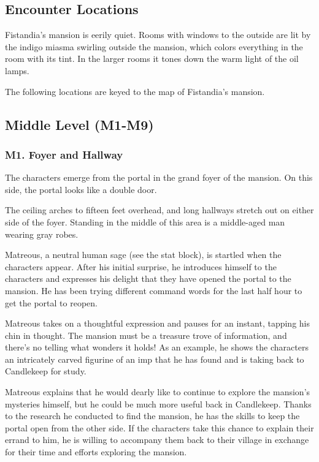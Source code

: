 \documentclass[10pt,a4paper,twoside,bg=print,twocolumn,openany,nodeprecatedcode]{dndbook}
\begin{document}
\subsection{Encounter Locations}
Fistandia's mansion is eerily quiet. Rooms with windows to the outside are lit by the indigo miasma swirling outside the mansion, which colors everything in the room with its tint. In the larger rooms it tones down the warm light of the oil lamps.

The following locations are keyed to the map of Fistandia's mansion.

\subsection{Middle Level (M1-M9)}
\subsubsection{M1. Foyer and Hallway}
The characters emerge from the portal in the grand foyer of the mansion. On this side, the portal looks like a double door.

\begin{DndReadAloud}{}
The ceiling arches to fifteen feet overhead, and long hallways stretch out on either side of the foyer. Standing in the middle of this area is a middle-aged man wearing gray robes.

\end{DndReadAloud}

Matreous, a neutral human sage (see the stat block), is startled when the characters appear. After his initial surprise, he introduces himself to the characters and expresses his delight that they have opened the portal to the mansion. He has been trying different command words for the last half hour to get the portal to reopen.

Matreous takes on a thoughtful expression and pauses for an instant, tapping his chin in thought. The mansion must be a treasure trove of information, and there's no telling what wonders it holds! As an example, he shows the characters an intricately carved figurine of an imp that he has found and is taking back to Candlekeep for study.

Matreous explains that he would dearly like to continue to explore the mansion's mysteries himself, but he could be much more useful back in Candlekeep. Thanks to the research he conducted to find the mansion, he has the skills to keep the portal open from the other side. If the characters take this chance to explain their errand to him, he is willing to accompany them back to their village in exchange for their time and efforts exploring the mansion.
\end{document}
